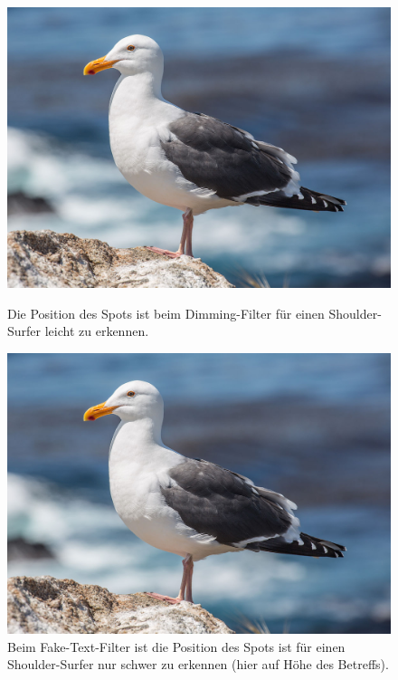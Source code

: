 \begin{figure}[hbt]
  \includegraphics[width=\linewidth]{figures/gull}
  \caption{Die Position des Spots ist beim Dimming-Filter für einen Shoulder-Surfer leicht zu erkennen.}
  \label{fig:shoulderVideoDimming}
\endminipage\hfill
{}
  \includegraphics[width=\linewidth]{figures/gull}
  \caption{Beim Fake-Text-Filter ist die Position des Spots ist für einen Shoulder-Surfer nur schwer zu erkennen (hier auf Höhe des Betreffs).}
  \label{fig:shoulderVideoFakeText}
  \endminipage
\end{figure}